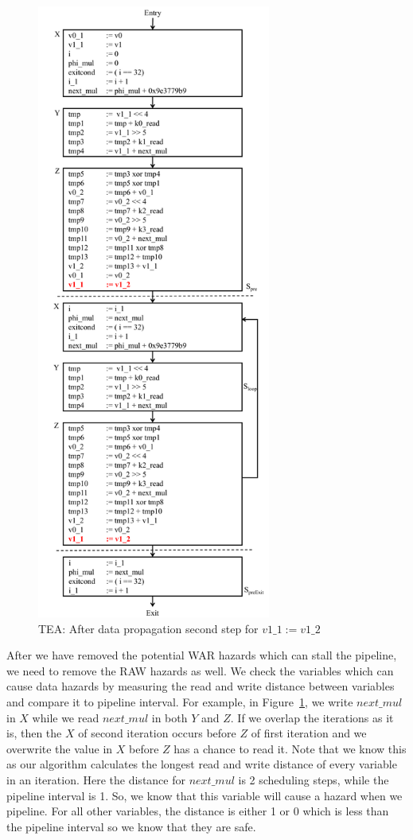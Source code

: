 \begin{figure}[H]
\begin{center}
\includegraphics[height=8in]{fig-proposal/tea-after-data-propagation4}
\caption{TEA: After data propagation second step for $v1\_1 := v1\_2$}
\label{fig:tea-after-data-propagation4}
\end{center}
\end{figure}

After we have removed the potential WAR hazards which can stall the pipeline, we need to remove the RAW hazards as well.
We check the variables which can cause data hazards by measuring the read and write distance between variables 
and compare it to pipeline interval. For example, in Figure~\ref{fig:tea-after-data-propagation4}, we write $next\_mul$ 
in $X$ while we read $next\_mul$ in both $Y$ and $Z$. 
If we overlap the iterations as it is, then the $X$ of second iteration occurs before $Z$ of first iteration and we overwrite the value in 
$X$ before $Z$ has a chance to read it. Note that we know this as our algorithm calculates the longest read and write distance of every variable 
in an iteration. Here the distance for $next\_mul$ is 2 scheduling steps, while the pipeline interval is 1. So, we know that this
variable will cause a hazard when we pipeline. For all other variables, the distance is either 1 or 0 which is less than the pipeline interval so we know that they are
safe. 

